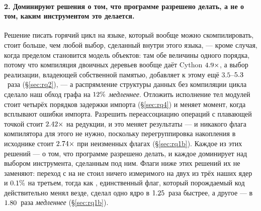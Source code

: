 \paragraph{2. Доминируют решения о том, что программе разрешено делать, а не о том, каким
инструментом это делается.} Решение писать горячий цикл на языке, который вообще можно
скомпилировать, стоит больше, чем любой выбор, сделанный внутри этого языка, --- кроме случая,
когда пределом становится модель объектов: там обе величины одного порядка, потому что
компиляция двоичных деревьев вообще даёт Cython $\meas{ratio:b2_branchy-314:binarytrees/cpython_loop|b2_branchy-314:binarytrees/cython}{4.9}\times$, а выбор реализации, владеющей
собственной памятью, добавляет к этому ещё $3.5$--$\meas{ratio:b2_branchy-314:binarytrees/numba|b2_branchy-314:binarytrees/rust_ctypes}{5.3}$~раза (\S\ref{sec:rq2}), ---
а распрямление структуры данных без компиляции цикла сделало наш обход графа на $\meas{pct:b2_branchy-314:bfs/cpython_flat|b2_branchy-314:bfs/cpython_loop}{12}\%$
\emph{медленнее}. Отложить исполнение тел модулей стоит четырёх порядков задержки импорта (\S\ref{sec:rq4}) и
меняет момент, когда всплывают ошибки импорта. Разрешить переассоциацию операций с
плавающей точкой стоит $\meas{ratio:b1_flags-314:arraysum/O3native|b1_flags-314:arraysum/O3native_ffast}{2.42}\times$ на редукции, и это меняет результаты --- и никакого флага
компилятора для этого не нужно, поскольку перегруппировка накопления в исходнике стоит
$\meas{ratio:b1_flags-314:arraysum/accum_acc1|b1_flags-314:arraysum/accum_acc4}{2.74}\times$ при неизменных флагах (\S\ref{sec:rq1b}). Каждое из этих решений --- о том, что
программе разрешено делать, и каждое доминирует над выбором инструмента, сделанным под ним. Флаги
ниже этих решений их не заменяют: переход с  на  не стоил ничего измеримого на
двух из трёх наших ядер и $\meas{pct:b1_flags-314:matmul/O2|b1_flags-314:matmul/O3}{0.1}\%$ на третьем, тогда как , единственный флаг,
который порождаемый код действительно менял везде, сделал одно ядро в $\meas{ratio:b1_flags-314:mandelbrot/O2|b1_flags-314:mandelbrot/O3native}{1.25}$~раза быстрее, а другое
--- в $\meas{ratio:b1_flags-314:matmul/O3native|b1_flags-314:matmul/O2}{1.80}$~раза \emph{медленнее} (\S\ref{sec:rq1b}).

